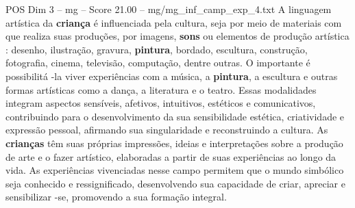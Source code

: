 \begin{textsample}{POS Dim 3 – mg – Score 21.00 – mg/mg\_inf\_camp\_exp\_4.txt}
A linguagem artística da \textbf{criança} é influenciada pela cultura, seja por meio de materiais com que realiza suas produções, por imagens, \textbf{sons} ou elementos de produção artística : desenho, ilustração, gravura, \textbf{pintura}, bordado, escultura, construção, fotografia, cinema, televisão, computação, dentre outras.
O importante é possibilitá -la viver experiências com a música, a \textbf{pintura}, a escultura e outras formas artísticas como a dança, a literatura e o teatro.
Essas modalidades integram aspectos sensíveis, afetivos, intuitivos, estéticos e comunicativos, contribuindo para o desenvolvimento da sua sensibilidade estética, criatividade e expressão pessoal, afirmando sua singularidade e reconstruindo a cultura.
As \textbf{crianças} têm suas próprias impressões, ideias e interpretações sobre a produção de arte e o fazer artístico, elaboradas a partir de suas experiências ao longo da vida.
As experiências vivenciadas nesse campo permitem que o mundo simbólico seja conhecido e ressignificado, desenvolvendo sua capacidade de criar, apreciar e sensibilizar -se, promovendo a sua formação integral.

\end{textsample}
